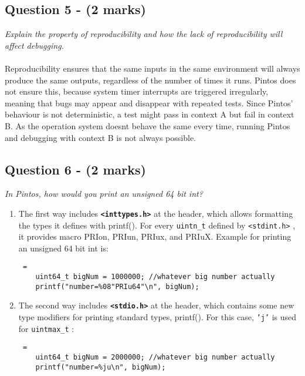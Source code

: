 \documentclass{article}
\begin{document}
\subsection*{Question 5 - (2 marks)}
\textit{Explain the property of reproducibility and how the lack of reproducibility will affect debugging.}
\\ \\
Reproducibility ensures that the same inputs in the same environment will always produce the same outputs, regardless of the number of times it runs. Pintos does not ensure this, because system timer interrupts are triggered irregularly, meaning that bugs may appear and disappear with repeated tests. Since Pintos' behaviour is not deterministic, a test might pass in context A but fail in context B. As the operation system doesnt behave the same every time, running Pintos and debugging with context B is not always possible.

\subsection*{Question 6 - (2 marks)}
\textit{In Pintos, how would you print an unsigned 64 bit int?}

\begin{enumerate}
\item The first way includes \textbf{\texttt{<inttypes.h>}} at the header, which allows formatting the types it defines with
printf(). For every \texttt{uintn\_t} defined by \texttt{<stdint.h>} , it provides macro PRIon, PRIun, PRIux, and PRIuX. Example for printing an unsigned 64 bit int is:

  \begin{lstlisting} =
    uint64_t bigNum = 1000000; //whatever big number actually
    printf("number=%08"PRIu64"\n", bigNum);
   \end{lstlisting}

\item The second way includes \textbf{\texttt{<stdio.h>}} at the header, which contains some new type modifiers for printing standard types, printf(). For this case, \texttt{'j'} is used for \texttt{uintmax\_t} :

  \begin{lstlisting} =
    uint64_t bigNum = 2000000; //whatever big number actually
    printf("number=%ju\n", bigNum);
   \end{lstlisting}

\end{enumerate}
\end{document}
